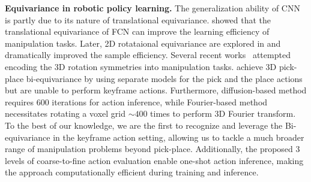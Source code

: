 \textbf{Equivariance in robotic policy learning.}
The generalization ability of CNN is partly due to its nature of translational equivariance. \cite{zeng2018robotic,Morrison-RSS-18} showed that the translational equivariance of FCN can improve the learning efficiency of manipulation tasks.
Later, 2D rotataional equivariance are explored in \cite{wang2021equivariant,zhu2022grasp,Huang-RSS-22,zhu2023grasp,jia2023seil,wang2022so2equivariant, wang2022onrobot, zhao2022integrating,wangequivariant} and dramatically improved the sample efficiency. Several recent works~\cite{simeonov2022neural, huang2022edge,ryu2023equivariant,huang2024fourier,ryu2023diffusionedfs,huorbitgrasp,huang2024imagination} attempted encoding the 3D rotation symmetries into manipulation tasks. 
\cite{ryu2023equivariant,ryu2023diffusionedfs,huang2024fourier} achieve 3D pick-place bi-equivariance by using separate models for the pick and the place actions but are unable to perform keyframe actions. Furthermore, diffusion-based method \cite{ryu2023diffusionedfs} requires $600$ iterations for action inference, while Fourier-based method \cite{huang2024fourier} necessitates rotating a voxel grid $\sim 400$ times to perform 3D Fourier transform.
To the best of our knowledge, we are the first to recognize and leverage the Bi-equivariance in the keyframe action setting, allowing us to tackle a much broader range of manipulation problems beyond pick-place. Additionally, the proposed 3 levels of coarse-to-fine action evaluation enable one-shot action inference, making the approach computationally efficient during training and inference.

